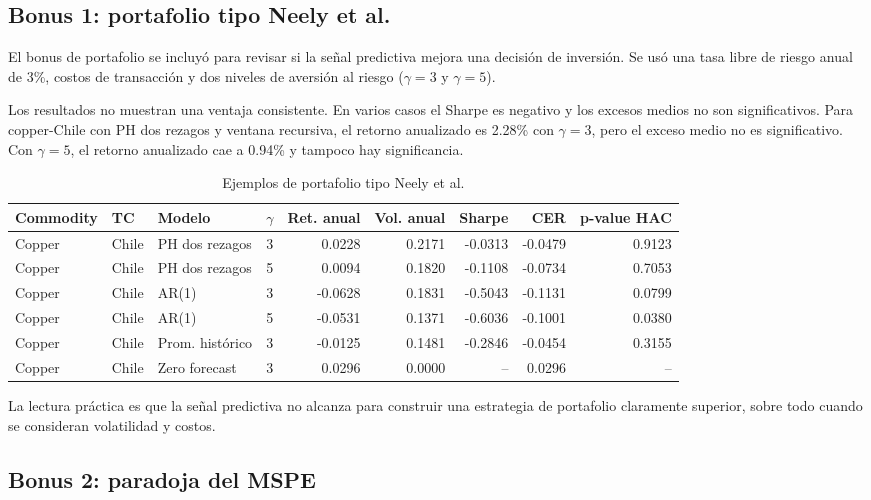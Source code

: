\documentclass[11pt,a4paper]{article}
\begin{document}
\subsection{Bonus 1: portafolio tipo Neely et al.}

El bonus de portafolio se incluyó para revisar si la señal predictiva mejora una decisión de inversión. Se usó una tasa libre de riesgo anual de 3\%, costos de transacción y dos niveles de aversión al riesgo ($\gamma=3$ y $\gamma=5$).

Los resultados no muestran una ventaja consistente. En varios casos el Sharpe es negativo y los excesos medios no son significativos. Para copper-Chile con PH dos rezagos y ventana recursiva, el retorno anualizado es 2.28\% con $\gamma=3$, pero el exceso medio no es significativo. Con $\gamma=5$, el retorno anualizado cae a 0.94\% y tampoco hay significancia.

\begin{table}[H]
\centering
\caption{Ejemplos de portafolio tipo Neely et al.}
\scriptsize
\begin{tabular}{llllrrrrr}
\toprule
Commodity & TC & Modelo & $\gamma$ & Ret. anual & Vol. anual & Sharpe & CER & p-value HAC \\
\midrule
Copper & Chile & PH dos rezagos & 3 & 0.0228 & 0.2171 & -0.0313 & -0.0479 & 0.9123 \\
Copper & Chile & PH dos rezagos & 5 & 0.0094 & 0.1820 & -0.1108 & -0.0734 & 0.7053 \\
Copper & Chile & AR(1) & 3 & -0.0628 & 0.1831 & -0.5043 & -0.1131 & 0.0799 \\
Copper & Chile & AR(1) & 5 & -0.0531 & 0.1371 & -0.6036 & -0.1001 & 0.0380 \\
Copper & Chile & Prom. histórico & 3 & -0.0125 & 0.1481 & -0.2846 & -0.0454 & 0.3155 \\
Copper & Chile & Zero forecast & 3 & 0.0296 & 0.0000 & -- & 0.0296 & -- \\
\bottomrule
\end{tabular}
\end{table}

La lectura práctica es que la señal predictiva no alcanza para construir una estrategia de portafolio claramente superior, sobre todo cuando se consideran volatilidad y costos.

\subsection{Bonus 2: paradoja del MSPE}
\end{document}
